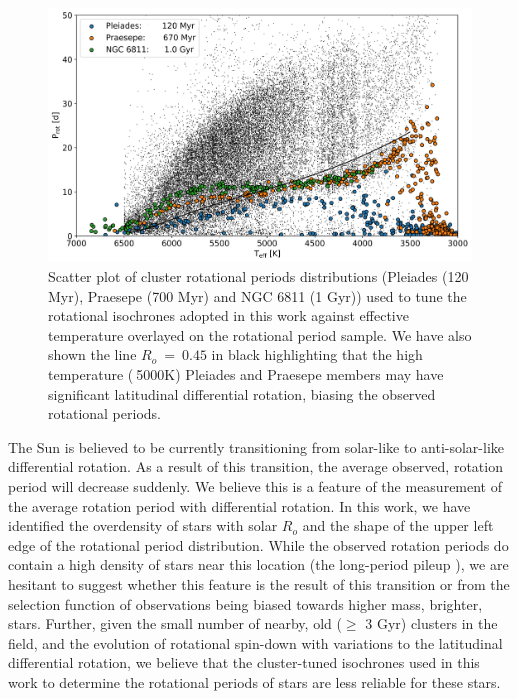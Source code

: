 \begin{figure}
\centering
  \includegraphics[width=\textwidth]{Figures/rot_gap_figures/com_gap_clus.png}
  \caption[Scatter plot of various cluster rotational periods distributions against effective temperature overlayed on the \kepler{} \citet{mcquillan_rotation_2014} rotational period sample.]{Scatter plot of cluster rotational periods distributions (Pleiades (120 Myr), Praesepe (700 Myr) and NGC 6811 (1 Gyr)) used to tune the rotational isochrones adopted in this work \citep{spada_competing_2020} against effective temperature overlayed on the \kepler{} \citet{mcquillan_rotation_2014} rotational period sample. We have also shown the line $R_o \ = \ 0.45$ in black highlighting that the high temperature ($\>$5000K) Pleiades and Praesepe members may have significant latitudinal differential rotation, biasing the observed rotational periods.}
  \label{fig:com_gap_clus}
\end{figure}

The Sun is believed to be currently transitioning from solar-like to anti-solar-like differential rotation.
As a result of this transition, the average observed, rotation period will decrease suddenly.
We believe this is a feature of the measurement of the average rotation period with differential rotation.
In this work, we have identified the overdensity of stars with solar $R_o$ and the shape of the upper left edge of the rotational period distribution.
While the observed \kepler{} rotation periods do contain a high density of stars near this location (the long-period pileup \citep{van_saders_forward_2019} ), we are hesitant to suggest whether this feature is the result of this transition or from the selection function of \kepler{} observations being biased towards higher mass, brighter, stars.
Further, given the small number of nearby, old ($\geq$ 3 Gyr) clusters in the \kepler{} field, and the evolution of rotational spin-down with variations to the latitudinal differential rotation, we believe that the cluster-tuned isochrones used in this work to determine the rotational periods of stars are less reliable for these stars.
 
